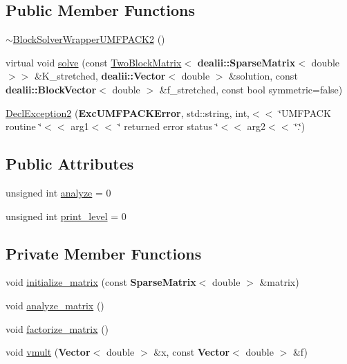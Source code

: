 \subsection*{Public Member Functions}
\begin{DoxyCompactItemize}
\item 
\hyperlink{class_block_solver_wrapper_u_m_f_p_a_c_k2_a8f298590602e05af072f1ce4178199f2}{$\sim$\+Block\+Solver\+Wrapper\+U\+M\+F\+P\+A\+C\+K2} ()
\item 
virtual void \hyperlink{class_block_solver_wrapper_u_m_f_p_a_c_k2_a651cb9299e8f368ba7294367260f9759}{solve} (const \hyperlink{class_two_block_matrix}{Two\+Block\+Matrix}$<$ {\bf dealii\+::\+Sparse\+Matrix}$<$ double $>$$>$ \&K\+\_\+stretched, {\bf dealii\+::\+Vector}$<$ double $>$ \&solution, const {\bf dealii\+::\+Block\+Vector}$<$ double $>$ \&f\+\_\+stretched, const bool symmetric=false)
\item 
\hyperlink{class_block_solver_wrapper_u_m_f_p_a_c_k2_aa454139937c8f01d8e893a7e09d3b1a2}{Decl\+Exception2} ({\bf Exc\+U\+M\+F\+P\+A\+C\+K\+Error}, std\+::string, int,$<$$<$ \char`\"{}U\+M\+F\+P\+A\+CK routine \char`\"{}$<$$<$ arg1$<$$<$ \char`\"{} returned error status \char`\"{}$<$$<$ arg2$<$$<$ \char`\"{}.\char`\"{})
\end{DoxyCompactItemize}
\subsection*{Public Attributes}
\begin{DoxyCompactItemize}
\item 
unsigned int \hyperlink{class_block_solver_wrapper_u_m_f_p_a_c_k2_a5869a4301c4e7a3ae64aa8998131d8c7}{analyze} = 0
\item 
unsigned int \hyperlink{class_block_solver_wrapper_u_m_f_p_a_c_k2_af78261735f66012f531c3a71c9640d2c}{print\+\_\+level} = 0
\end{DoxyCompactItemize}
\subsection*{Private Member Functions}
\begin{DoxyCompactItemize}
\item 
void \hyperlink{class_block_solver_wrapper_u_m_f_p_a_c_k2_a8df429ef59e02922971ed01dd4780cee}{initialize\+\_\+matrix} (const {\bf Sparse\+Matrix}$<$ double $>$ \&matrix)
\item 
void \hyperlink{class_block_solver_wrapper_u_m_f_p_a_c_k2_afc9d5243e71aa81bd391e36976ef5623}{analyze\+\_\+matrix} ()
\item 
void \hyperlink{class_block_solver_wrapper_u_m_f_p_a_c_k2_a1fb479f8089c3b71b2632f0267e6e7ff}{factorize\+\_\+matrix} ()
\item 
void \hyperlink{class_block_solver_wrapper_u_m_f_p_a_c_k2_ac308e6181b48e7e35f533d90a89773f3}{vmult} ({\bf Vector}$<$ double $>$ \&x, const {\bf Vector}$<$ double $>$ \&f)
\end{DoxyCompactItemize}
